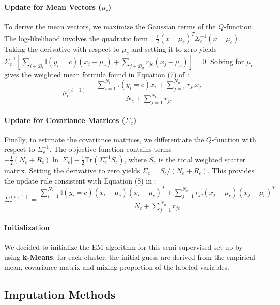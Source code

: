 \documentclass[11pt, a4paper]{article}
\begin{document}
\paragraph{Update for Mean Vectors ($\mu_c$)}
To derive the mean vectors, we maximize the Gaussian terms of the $Q$-function. The log-likelihood involves the quadratic form $-\frac{1}{2}(x-\mu_c)^T\Sigma_c^{-1}(x-\mu_c)$. Taking the derivative with respect to $\mu_c$ and setting it to zero yields $\Sigma_c^{-1} [ \sum_{i \in \mathcal{D}_l} \mathbb{I}(y_i=c)(x_i - \mu_c) + \sum_{j \in \mathcal{D}_u} r_{jc}(x_j - \mu_c) ] = 0$. Solving for $\mu_c$ gives the weighted mean formula found in Equation (7) of \citep{He2020}:
\begin{equation}
    \mu_c^{(t+1)} = \frac{\sum_{i=1}^{N_l} \mathbb{I}(y_i=c) x_i + \sum_{j=1}^{N_u} r_{jc} x_j}{N_c + \sum_{j=1}^{N_u} r_{jc}}
\end{equation}

\paragraph{Update for Covariance Matrices ($\Sigma_c$)}
Finally, to estimate the covariance matrices, we differentiate the $Q$-function with respect to $\Sigma_c^{-1}$. The objective function contains terms $-\frac{1}{2}(N_c + R_c)\ln|\Sigma_c| - \frac{1}{2}\text{Tr}(\Sigma_c^{-1} S_c)$, where $S_c$ is the total weighted scatter matrix. Setting the derivative to zero yields $\Sigma_c = S_c / (N_c + R_c)$. This provides the update rule consistent with Equation (8) in \citep{He2020}:
\begin{equation}
    \Sigma_c^{(t+1)} = \frac{\sum_{i=1}^{N_l} \mathbb{I}(y_i=c) (x_i - \mu_c)(x_i - \mu_c)^T + \sum_{j=1}^{N_u} r_{jc} (x_j - \mu_c)(x_j - \mu_c)^T}{N_c + \sum_{j=1}^{N_u} r_{jc}}
\end{equation}

\paragraph{Initialization}
We decided to initialize the EM algorithm for this semi-supervised set up by using \textbf{k-Means}: for each cluster, the initial guess are derived from the empirical mean, covariance matrix and mixing proportion of the labeled variables. 

\subsection{Imputation Methods}
\end{document}
